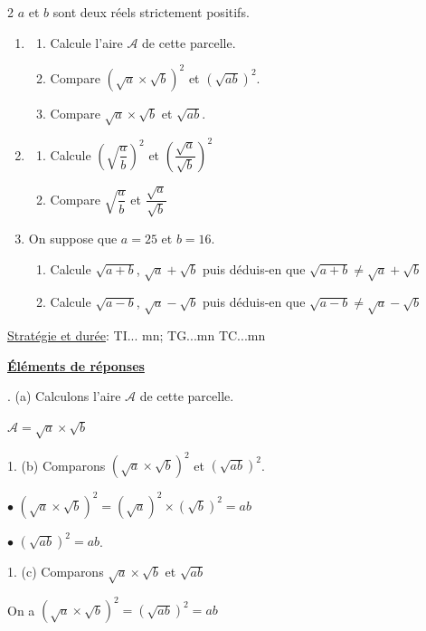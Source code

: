 \begin{multicols*}{2}
  	$a$ et $b$ sont deux réels strictement positifs.
  	\begin{enumerate}
  		\item 
  		\begin{enumerate}
  			\item  Calcule l'aire $\mathcal{A}$ de cette parcelle.
  			\item Compare $\left(\sqrt{a} \times \sqrt{b}\right)^2$ et $\left(\sqrt{a b}\right)^2$.
  			\item  Compare $\sqrt{a} \times \sqrt{b}$ et $\sqrt{ab}$.
  		\end{enumerate}
  		\item 
  		\begin{enumerate}
  			\item  
  			Calcule $\left(\sqrt{\dfrac{a}{b}} \right)^2$ et $\left(\dfrac{\sqrt{a}}{\sqrt{b}} \right)^2$
  			\item Compare $\sqrt{\dfrac{a}{b}}$ et $\dfrac{\sqrt{a}}{\sqrt{b}}$
  		\end{enumerate}	
  		\item On suppose que $a=25$ et $b=16$.
  		\begin{enumerate}
  			\item Calcule $\sqrt{a+b}$, $\sqrt{a}+\sqrt{b}$ puis déduis-en que  $\sqrt{a+b}\neq \sqrt{a}+\sqrt{b}$
  			\item Calcule  $\sqrt{a-b}$, $\sqrt{a}-\sqrt{b}$ puis déduis-en que  $\sqrt{a-b}\neq \sqrt{a}-\sqrt{b}$	
  		\end{enumerate}		
  	\end{enumerate}
  	\underline{Stratégie et durée}: TI... mn; TG...mn TC...mn
  	\begin{center}
  		\underline{\textbf{Éléments de réponses}}
  	\end{center}
  	. (a) Calculons l'aire $\mathcal{A}$ de cette parcelle.
  	
  	$\mathcal{A}= \sqrt{a} \times \sqrt{b}$
  	
  	1. (b) Comparons $\left(\sqrt{a} \times \sqrt{b}\right)^2$ et $\left(\sqrt{a b}\right)^2$.
  	
  	$\bullet$ $\left(\sqrt{a} \times \sqrt{b}\right)^2= \left(\sqrt{a}\right)^2 \times \left(\sqrt{b}\right)^2= ab $
  	
  	$\bullet$ $\left(\sqrt{a b}\right)^2= ab$.
  	
  	1. (c)  Comparons $\sqrt{a} \times \sqrt{b}$ et $\sqrt{ab}$
  	
  	On a $\left(\sqrt{a} \times \sqrt{b}\right)^2 =\left(\sqrt{a b}\right)^2 = ab $
  	

\end{multicols*}
